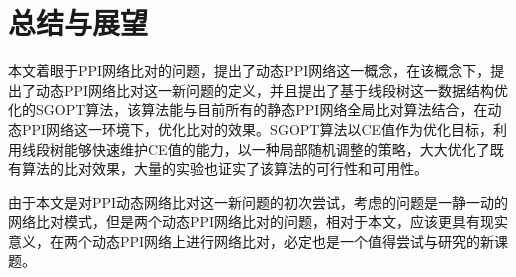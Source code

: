 \chapter{总结与展望}

本文着眼于PPI网络比对的问题，提出了动态PPI网络这一概念，在该概念下，提出了动态PPI网络比对这一新问题的定义，并且提出了基于线段树这一数据结构优化的SGOPT算法，该算法能与目前所有的静态PPI网络全局比对算法结合，在动态PPI网络这一环境下，优化比对的效果。SGOPT算法以CE值作为优化目标，利用线段树能够快速维护CE值的能力，以一种局部随机调整的策略，大大优化了既有算法的比对效果，大量的实验也证实了该算法的可行性和可用性。

由于本文是对PPI动态网络比对这一新问题的初次尝试，考虑的问题是一静一动的网络比对模式，但是两个动态PPI网络比对的问题，相对于本文，应该更具有现实意义，在两个动态PPI网络上进行网络比对，必定也是一个值得尝试与研究的新课题。
